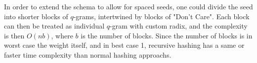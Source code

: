 In order to extend the schema to allow for spaced seeds, one could divide the seed into shorter blocks of \(q\)-grams, intertwined by blocks of "Don't Care". Each block can then be treated as individual \(q\)-gram with custom radix, and the complexity is then \(O(nb)\), where \(b\) is the number of blocks. Since the number of blocks is in worst case the weight itself, and in best case 1, recursive hashing has a same or faster time complexity than normal hashing approachs.